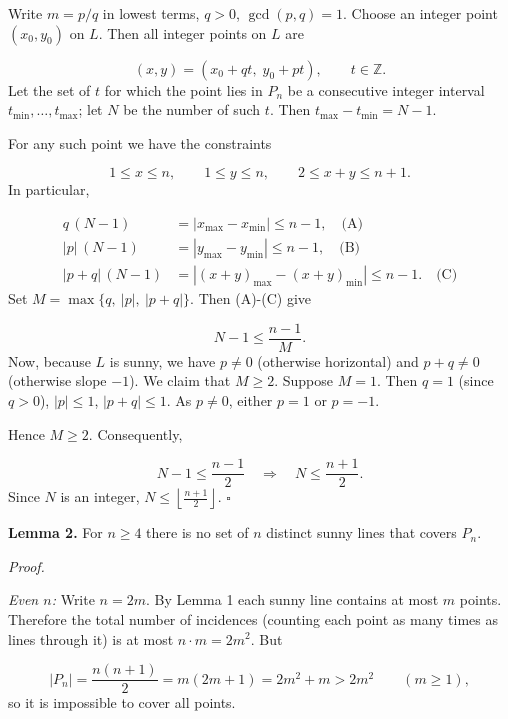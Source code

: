 Write \(m = p/q\) in lowest terms, \(q>0\), \(\gcd(p,q)=1\). Choose an integer point \((x_0,y_0)\) on \(L\). Then all integer points on \(L\) are\par
\[
(x,y) = (x_0 + q t,\; y_0 + p t),\qquad t\in\mathbb Z.
\]
Let the set of \(t\) for which the point lies in \(P_n\) be a consecutive integer interval \(t_{\min},\dots,t_{\max}\); let \(N\) be the number of such \(t\). Then \(t_{\max}-t_{\min} = N-1\).\par
For any such point we have the constraints\par
\[
1 \le x \le n,\qquad 1 \le y \le n,\qquad 2 \le x+y \le n+1.
\]
In particular,\par
\begin{align*}
q\,(N-1) &= |x_{\max}-x_{\min}| \le n-1, \quad\text{(A)}\\
|p|\,(N-1) &= |y_{\max}-y_{\min}| \le n-1, \quad\text{(B)}\\
|p+q|\,(N-1) &= |(x+y)_{\max}-(x+y)_{\min}| \le n-1. \quad\text{(C)}
\end{align*}
Set \(M = \max\{q,\ |p|,\ |p+q|\}\). Then (A)-(C) give\par
\[
N-1 \le \frac{n-1}{M}.
\]
Now, because \(L\) is sunny, we have \(p \neq 0\) (otherwise horizontal) and \(p+q \neq 0\) (otherwise slope \(-1\)). We claim that \(M \ge 2\). Suppose \(M = 1\). Then \(q = 1\) (since \(q>0\)), \(|p| \le 1\), \(|p+q| \le 1\). As \(p \neq 0\), either \(p = 1\) or \(p = -1\).\par
{}
Hence \(M \ge 2\). Consequently,\par
\[
N-1 \le \frac{n-1}{2}\quad\Longrightarrow\quad N \le \frac{n+1}{2}.
\]
Since \(N\) is an integer, \(N \le \left\lfloor\frac{n+1}{2}\right\rfloor\). \(\square\)\par
\smallskip
{}
\textbf{Lemma 2.} For \(n \ge 4\) there is no set of \(n\) distinct sunny lines that covers \(P_n\).\par
\emph{Proof.}\par
\emph{Even \(n\):} Write \(n = 2m\). By Lemma 1 each sunny line contains at most \(m\) points. Therefore the total number of incidences (counting each point as many times as lines through it) is at most \(n \cdot m = 2m^2\). But\par
\[
|P_n| = \frac{n(n+1)}{2} = m(2m+1) = 2m^2 + m > 2m^2 \qquad (m\ge1),
\]
so it is impossible to cover all points.\par
